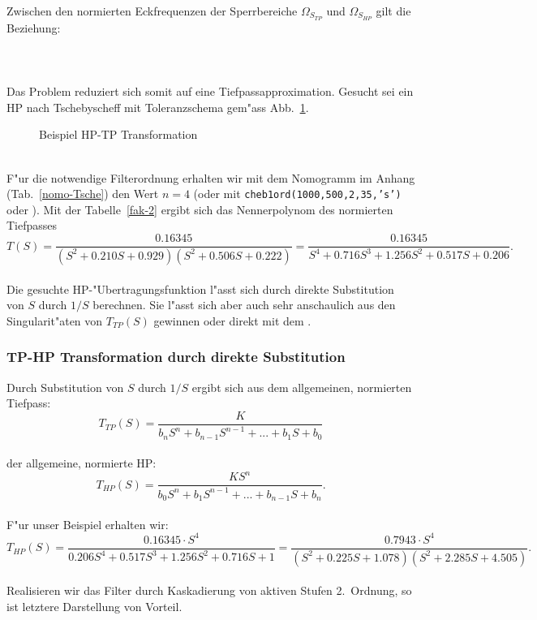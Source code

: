 Zwischen den normierten Eckfrequenzen der Sperrbereiche $\Omega_{S_{TP}}$ und $\Omega_{S_{HP}}$ gilt die
Beziehung:\\~\\
~\\~\\
Das Problem reduziert sich somit auf eine Tiefpassapproximation.
\bsp{}
Gesucht sei ein HP nach Tschebyscheff mit Toleranzschema gem"ass
Abb.~\ref{bsp-hp}.
\begin{figure}[!htb]
\vspace*{-3mm}
\begin{center}
  \vspace*{-5mm}\caption{Beispiel HP-TP Transformation \label{bsp-hp}}
\end{center}
\vspace*{-6mm}
\end{figure}~\\
F"ur die notwendige Filterordnung erhalten wir
mit dem Nomogramm im Anhang (Tab.~\ref{nomo-Tsche}) den Wert $n=4$
(oder mit {\tt cheb1ord(1000,500,2,35,'s')} oder ). Mit der Tabelle~\ref{fak-2} ergibt sich das Nennerpolynom des
normierten Tiefpasses 
{\footnotesize \begin{equation*} T(S)=
    \frac{0.16345}{(S^{2}+0.210S+0.929)(S^{2}+0.506S+0.222)}
   =\frac{0.16345}{S^{4}+0.716S^{3}+1.256S^{2}+0.517S+0.206}.
\end{equation*}}\\
\nit Die gesuchte HP-"Ubertragungsfunktion l"asst sich durch direkte
Substitution von $S$ durch $1/S$ berechnen.
Sie l"asst sich aber auch sehr anschaulich aus den Singularit"aten von
$T_{TP}(S)$ gewinnen oder direkt mit dem .
\subsubsection{TP-HP Transformation durch direkte Substitution}
Durch Substitution von $S$ durch $1/S$  ergibt sich aus dem allgemeinen, normierten
Tiefpass:
\begin{equation*}
T_{TP}(S)=\frac{K}{b_{n}S^{n}+b_{n-1}S^{n-1}+...+b_{1}S+b_{0}}
\end{equation*}\\
\nit der allgemeine, normierte HP:
\begin{equation*}
T_{HP}(S)=\frac{KS^{n}}{b_{0}S^{n}+b_{1}S^{n-1}+...+b_{n-1}S+b_{n}}.
\end{equation*}\\
\nit F"ur unser Beispiel erhalten wir:
{\footnotesize
\begin{equation*}
T_{HP}(S)=\frac{0.16345\cdot S^{4}}{0.206S^{4}+0.517S^{3}+1.256S^{2}+0.716S+1}=\frac{0.7943\cdot S^{4}}{(S^{2}+0.225S+1.078)(S^{2}+2.285S+4.505)}.
\end{equation*}}\\
\nit Realisieren wir das Filter durch Kaskadierung von aktiven Stufen 2.~Ordnung,
so ist letztere Darstellung von Vorteil.
